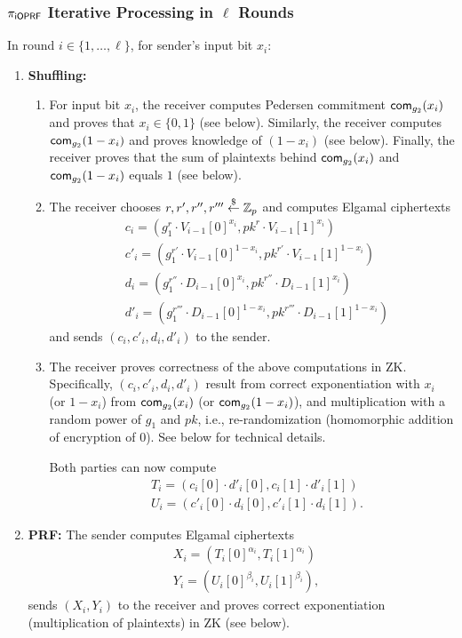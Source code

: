 \subsubsection{${\pi_{\mathsf{i}\mathsf{OPRF}}}$ Iterative Processing in $\ell$ Rounds}
In round $i\in\{1,\ldots,\ell\}$, for sender's input bit $x_i$:
\begin{enumerate}
\item {\bf Shuffling:}
\begin{enumerate}
\item For input bit $x_i$, the receiver computes Pedersen commitment
  $\mathsf{com}_{g_2}(x_i)$ and proves that $x_i\in\{0,1\}$ (see
  below). Similarly, the receiver computes $\mathsf{com}_{g_2}(1-x_i)$ and
  proves knowledge of $(1-x_i)$ (see below). Finally, the receiver
  proves that the sum of plaintexts behind $\mathsf{com}_{g_2}(x_i)$ and
  $\mathsf{com}_{g_2}(1-x_i)$ equals $1$ (see below).


\item  The receiver chooses $r,r',r'',r'''\stackrel{\$}{\leftarrow}\mathbb{Z}_p$ and computes Elgamal ciphertexts
  \begin{align*}
    &c_i=(g_1^r\cdot{}V_{i-1}[0]^{x_i},pk^{r}\cdot{}V_{i-1}[1]^{x_i})
    \\&c'_i=(g_1^{r'}\cdot{}V_{i-1}[0]^{1-x_i},pk^{r'}\cdot{}V_{i-1}[1]^{1-x_i})
    \\&d_i=(g_1^{r''}\cdot{}D_{i-1}[0]^{x_i},pk^{r''}\cdot{}D_{i-1}[1]^{x_i})
    \\&d'_i=(g_1^{r'''}\cdot{}D_{i-1}[0]^{1-x_i},pk^{r'''}\cdot{}D_{i-1}[1]^{1-x_i})%
  \end{align*}
  and sends $(c_i,c'_i,d_i,d'_i)$ to the sender.

\item The receiver proves correctness of the above computations in
  ZK. Specifically, $(c_i,c'_i,d_i,d'_i)$ result from correct
  exponentiation with $x_i$ (or $1-x_i$) from $\mathsf{com}_{g_2}(x_i)$ (or
  $\mathsf{com}_{g_2}(1-x_i)$), and multiplication with a random power of
  $g_1$ and $pk$, i.e., re-randomization (homomorphic addition of
  encryption of $0$).  See below for technical details.

   Both parties can now compute
    \begin{align*}&T_i=(c_i[0]\cdot{}d'_i[0],c_i[1]\cdot{}d'_i[1])
    \\&U_i=(c'_i[0]\cdot{}d_i[0],c'_i[1]\cdot{}d_i[1]).
    \end{align*}
   
  \end{enumerate}

\item {\bf PRF:} The sender computes Elgamal ciphertexts
  \begin{align*}
&X_i=(T_i[0]^{\alpha_i},T_i[1]^{\alpha_i})
\\&Y_i=(U_i[0]^{\beta_i},U_i[1]^{\beta_i}),
  \end{align*}
sends $(X_i,Y_i)$ to the receiver and proves correct exponentiation
(multiplication of plaintexts) in ZK (see below).


\end{enumerate}
